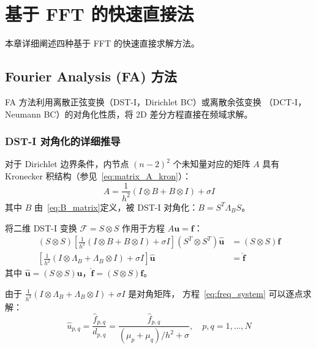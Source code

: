 \section{基于 FFT 的快速直接法}
\label{sec:fft}

本章详细阐述四种基于 FFT 的快速直接求解方法。

\subsection{Fourier Analysis (FA) 方法}

FA 方法利用离散正弦变换（DST-I，Dirichlet BC）或离散余弦变换
（DCT-I，Neumann BC）的对角化性质，将 2D 差分方程直接在频域求解。

\subsubsection{DST-I 对角化的详细推导}

对于 Dirichlet 边界条件，内节点 $(n-2)^2$ 个未知量对应的矩阵 $A$
具有 Kronecker 积结构（参见~\eqref{eq:matrix_A_kron}）：
\begin{equation}
  A = \frac{1}{h^2}(I \otimes B + B \otimes I) + \sigma I
  \label{eq:A_kron}
\end{equation}
其中 $B$ 由~\eqref{eq:B_matrix}定义，被 DST-I 对角化：$B = S^T \Lambda_B S$。

将二维 DST-I 变换 $\mathcal{F} = S \otimes S$ 作用于方程 $A\mathbf{u} = \mathbf{f}$：
\begin{align}
  (S \otimes S)\left[\frac{1}{h^2}(I \otimes B + B \otimes I) + \sigma I\right](S^T \otimes S^T)\hat{\mathbf{u}} &= (S \otimes S)\mathbf{f} \\
  \left[\frac{1}{h^2}(I \otimes \Lambda_B + \Lambda_B \otimes I) + \sigma I\right]\hat{\mathbf{u}} &= \hat{\mathbf{f}}
  \label{eq:freq_system}
\end{align}
其中 $\hat{\mathbf{u}} = (S \otimes S)\mathbf{u}$，$\hat{\mathbf{f}} = (S \otimes S)\mathbf{f}$。

由于 $\frac{1}{h^2}(I \otimes \Lambda_B + \Lambda_B \otimes I) + \sigma I$ 是对角矩阵，
方程~\eqref{eq:freq_system} 可以逐点求解：
\begin{equation}
  \hat{u}_{p,q} = \frac{\hat{f}_{p,q}}{d_{p,q}} = \frac{\hat{f}_{p,q}}{(\mu_p+\mu_q)/h^2 + \sigma}, \quad p,q = 1, \ldots, N
  \label{eq:freq_solve}
\end{equation}

